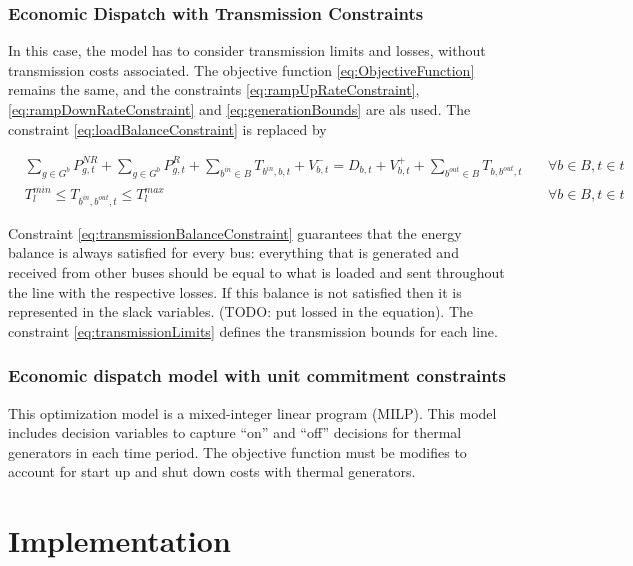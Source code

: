 \documentclass[12pt,LUDisStyle,twosided]{book}
\begin{document}
\subsubsection{Economic Dispatch with Transmission Constraints}

In this case, the model has to consider transmission limits and losses, without transmission costs associated. The objective function \ref{eq:ObjectiveFunction} remains the same, and the constraints \ref{eq:rampUpRateConstraint}, \ref{eq:rampDownRateConstraint} and \ref{eq:generationBounds} are als used. The constraint \ref{eq:loadBalanceConstraint} is replaced by  

\begin{subequations}\label{model:edTransmissionConstraints}
\begin{alignat}{4}
&\sum_{g \in G^{b}} P^{NR}_{g,t} + \sum_{g \in G^{b}} P^{R}_{g,t} + \sum_{b^{in} \in B} T_{b^{in},b,t} + V^{-}_{b,t} = D_{b,t}  + V^{+}_{b,t} + \sum_{b^{out} \in B} T_{b,b^{out},t}  &~& \forall b \in B, t \in t \label{eq:transmissionBalanceConstraint} \\
& T^{min}_{l} \leq T_{b^{in},b^{out},t} \leq T^{max}_{l}  &~& \forall b \in B, t \in t \label{eq:transmissionLimits}
\end{alignat} 
\end{subequations}

Constraint \ref{eq:transmissionBalanceConstraint} guarantees that the energy balance is always satisfied for every bus: everything that is generated and received from other buses should be equal to what is loaded and sent throughout the line with the respective losses. If this balance is not satisfied then it is represented in the slack variables. (TODO: put lossed in the equation). The constraint \ref{eq:transmissionLimits} defines the transmission bounds for each line.

\subsubsection{Economic dispatch model with unit commitment constraints}
This optimization model is a mixed-integer linear program (MILP).
This model includes decision variables to capture ``on'' and ``off'' decisions for thermal generators in each time period. 
The objective function must be modifies to account for start up and shut down costs with thermal generators.

\section{Implementation}
\end{document}
